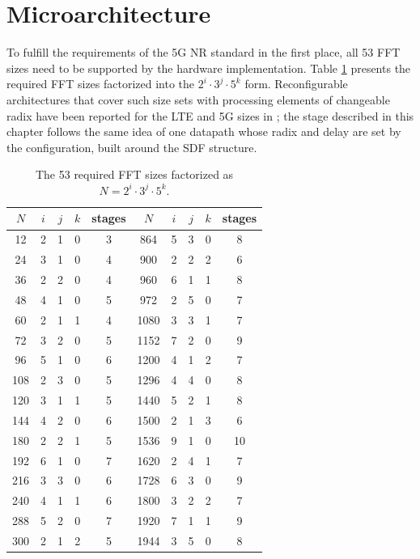 \documentclass[a4paper,12pt, master]{etf}
\begin{document}
\section{Microarchitecture}

To fulfill the requirements of the 5G NR standard in the first place, all 53 FFT sizes need to be supported by the hardware implementation. Table \ref{tab:fft_sizes_factorized} presents the required FFT sizes factorized into the $2^i \cdot 3^j \cdot 5^k$ form. Reconfigurable architectures that cover such size sets with processing elements of changeable radix have been reported for the LTE and 5G sizes in \cite{shih2018, yang2023}; the stage described in this chapter follows the same idea of one datapath whose radix and delay are set by the configuration, built around the SDF structure.

\begin{table}[H]
\centering
\caption{The 53 required FFT sizes factorized as $N = 2^{i} \cdot 3^{j} \cdot 5^{k}$.}
\medskip
\label{tab:fft_sizes_factorized}
\begin{tabular}{c | c c c | c || c | c c c | c}
\hline
$N$ & $i$ & $j$ & $k$ & stages & $N$ & $i$ & $j$ & $k$ & stages\\
\hline
\hline
12 & 2 & 1 & 0 & 3 & 864 & 5 & 3 & 0 & 8\\
24 & 3 & 1 & 0 & 4 & 900 & 2 & 2 & 2 & 6\\
36 & 2 & 2 & 0 & 4 & 960 & 6 & 1 & 1 & 8\\
48 & 4 & 1 & 0 & 5 & 972 & 2 & 5 & 0 & 7\\
60 & 2 & 1 & 1 & 4 & 1080 & 3 & 3 & 1 & 7\\
72 & 3 & 2 & 0 & 5 & 1152 & 7 & 2 & 0 & 9\\
96 & 5 & 1 & 0 & 6 & 1200 & 4 & 1 & 2 & 7\\
108 & 2 & 3 & 0 & 5 & 1296 & 4 & 4 & 0 & 8\\
120 & 3 & 1 & 1 & 5 & 1440 & 5 & 2 & 1 & 8\\
144 & 4 & 2 & 0 & 6 & 1500 & 2 & 1 & 3 & 6\\
180 & 2 & 2 & 1 & 5 & 1536 & 9 & 1 & 0 & 10\\
192 & 6 & 1 & 0 & 7 & 1620 & 2 & 4 & 1 & 7\\
216 & 3 & 3 & 0 & 6 & 1728 & 6 & 3 & 0 & 9\\
240 & 4 & 1 & 1 & 6 & 1800 & 3 & 2 & 2 & 7\\
288 & 5 & 2 & 0 & 7 & 1920 & 7 & 1 & 1 & 9\\
300 & 2 & 1 & 2 & 5 & 1944 & 3 & 5 & 0 & 8\\

\end{tabular}
\end{table}
\end{document}
